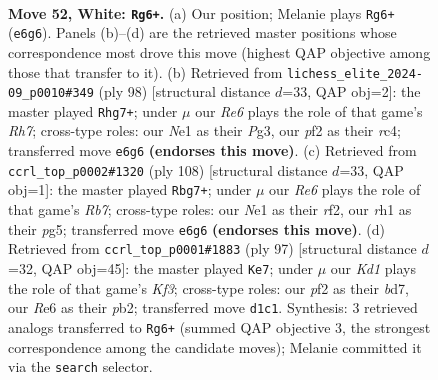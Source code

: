 \documentclass[11pt]{article}
\begin{document}
\clearpage

\begin{figure}[p]\centering
\begin{subfigure}{0.46\textwidth}\centering
\resizebox{\linewidth}{!}{%
\newchessgame
\chessboard[
  setfen={8/6k1/4R3/2p4P/4R3/8/1P3p2/3KN2r w - - 5 52},
  showmover=false,
  pgfstyle=straightmove, color=movearrow, markmove={e6-g6}
]}
\caption{}
\end{subfigure}\hfill
\begin{subfigure}{0.46\textwidth}\centering
\resizebox{\linewidth}{!}{%
\newchessgame
\chessboard[
  setfen={6k1/1R5R/8/5K1p/1Pr5/6P1/4r3/8 w - - 2 50},
  showmover=false,
  pgfstyle=straightmove, color=movearrow, markmove={h7-g7}
]}
\caption{}
\end{subfigure}
\\[4pt]
\begin{subfigure}{0.46\textwidth}\centering
\resizebox{\linewidth}{!}{%
\newchessgame
\chessboard[
  setfen={4r1k1/1R5R/p7/4P1p1/8/8/5r2/2K5 w - - 1 55},
  showmover=false,
  pgfstyle=straightmove, color=movearrow, markmove={b7-g7}
]}
\caption{}
\end{subfigure}\hfill
\begin{subfigure}{0.46\textwidth}\centering
\resizebox{\linewidth}{!}{%
\newchessgame
\chessboard[
  setfen={8/3B4/3Rnk2/4r3/1pp3P1/5K2/1P6/8 b - - 1 49},
  showmover=false,
  pgfstyle=straightmove, color=movearrow, markmove={f6-e7}
]}
\caption{}
\end{subfigure}
\caption{\textbf{Move 52, White: \texttt{Rg6+}.} (a) Our position; Melanie plays \texttt{Rg6+} (\texttt{e6g6}). Panels (b)--(d) are the retrieved master positions whose correspondence most drove this move (highest QAP objective among those that transfer to it). (b) Retrieved from \texttt{lichess\_elite\_2024-09\_p0010\#349} (ply 98) [structural distance $d$=33, QAP obj=2]: the master played \texttt{Rhg7+}; under $\mu$ our \emph{Re6} plays the role of that game's \emph{Rh7}; cross-type roles: our \emph{N}e1 as their \emph{P}g3, our \emph{p}f2 as their \emph{r}c4; transferred move \texttt{e6g6} \textbf{(endorses this move)}. (c) Retrieved from \texttt{ccrl\_top\_p0002\#1320} (ply 108) [structural distance $d$=33, QAP obj=1]: the master played \texttt{Rbg7+}; under $\mu$ our \emph{Re6} plays the role of that game's \emph{Rb7}; cross-type roles: our \emph{N}e1 as their \emph{r}f2, our \emph{r}h1 as their \emph{p}g5; transferred move \texttt{e6g6} \textbf{(endorses this move)}. (d) Retrieved from \texttt{ccrl\_top\_p0001\#1883} (ply 97) [structural distance $d$=32, QAP obj=45]: the master played \texttt{Ke7}; under $\mu$ our \emph{Kd1} plays the role of that game's \emph{Kf3}; cross-type roles: our \emph{p}f2 as their \emph{b}d7, our \emph{R}e6 as their \emph{p}b2; transferred move \texttt{d1c1}. Synthesis: 3 retrieved analogs transferred to \texttt{Rg6+} (summed QAP objective 3, the strongest correspondence among the candidate moves); Melanie committed it via the \texttt{search} selector.}
\label{fig:thought-m102}
\end{figure}
\end{document}
